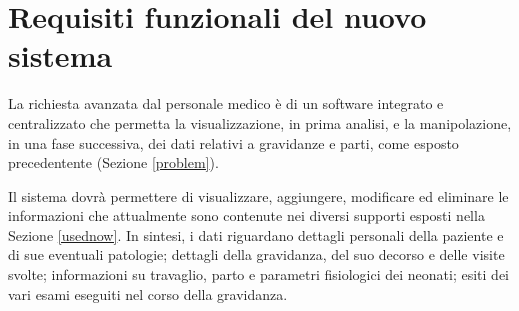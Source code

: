 \section{Requisiti funzionali del nuovo sistema}
\label{functionalrequirements}

La richiesta avanzata dal personale medico è di un software integrato e centralizzato che permetta la visualizzazione, in prima analisi, e la manipolazione, in una fase successiva, dei dati relativi a gravidanze e parti, come esposto precedentente (Sezione \ref{problem}).

Il sistema dovrà permettere di visualizzare, aggiungere, modificare ed eliminare le informazioni che attualmente sono contenute nei diversi supporti esposti nella Sezione \ref{usednow}.
In sintesi, i dati riguardano dettagli personali della paziente e di sue eventuali patologie; dettagli della gravidanza, del suo decorso e delle visite svolte; informazioni su travaglio, parto e parametri fisiologici dei neonati; esiti dei vari esami eseguiti nel corso della gravidanza.

